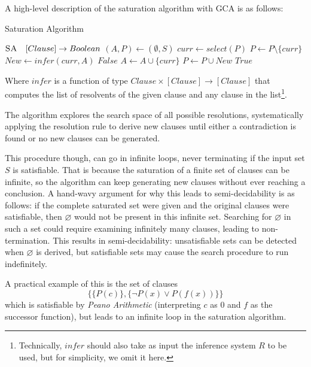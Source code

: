 A high-level description of the saturation algorithm with GCA is as follows:
\begin{algorithm}[H]
    \caption{Saturation Algorithm}\label{alg:saturation-algorithm}
    \begin{algorithmic}[1]
        \Statex{}  \(\textsc{SA} \quad [Clause] \to Boolean\)
            \State{} \((A,P)\gets (\emptyset,S)\)
                \State{} \(curr \gets select(P)\)
                \State{} \(P \gets P \setminus \{curr\}\)
                \State{} \(New \gets infer(curr, A)\)
                    \State{}  \(False\)
                \EndIf{}
                \State{} \(A \gets A \cup \{curr\}\)
                \State{} \(P \gets P \cup New\)
            \EndWhile{}
            \State{}  \(True\)
        \EndFunction{}
    \end{algorithmic}
\end{algorithm}

Where \(infer\) is a function of type \(Clause \times [Clause] \to [Clause]\) that computes the list of resolvents of the given clause and any clause in the list\footnote{
  Technically, \(infer\) should also take as input the inference system \(R\) to be used, but for simplicity, we omit it here.
}.

The algorithm explores the search space of all possible resolutions, systematically applying the resolution rule to derive new clauses until either a contradiction is found or no new clauses can be generated.

This procedure though, can go in infinite loops, never terminating if the input set \(S\) is satisfiable.
That is because the saturation of a finite set of clauses can be infinite, so the algorithm can keep generating new clauses without ever reaching a conclusion.
A hand-wavy argument for why this leads to semi-decidability is as follows: if the complete saturated set were given and the original clauses were satisfiable, then \(\varnothing\) would not be present in this infinite set.
Searching for \(\varnothing\) in such a set could require examining infinitely many clauses, leading to non-termination.
This results in semi-decidability: unsatisfiable sets can be detected when \(\varnothing\) is derived, but satisfiable sets may cause the search procedure to run indefinitely.

A practical example of this is the set of clauses
\begin{equation}\label{eq:non_terminating}
  \{ \{P(c)\}, \{\neg P(x) \lor P(f(x))\} \}
\end{equation}
which is satisfiable by \emph{Peano Arithmetic} (interpreting \(c\) as \(0\) and \(f\) as the successor function), but leads to an infinite loop in the saturation algorithm.


